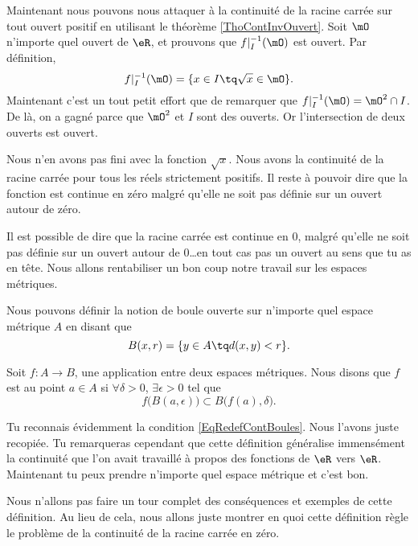 Maintenant nous pouvons nous attaquer à la continuité de la racine carrée sur tout ouvert positif en utilisant le théorème \ref{ThoContInvOuvert}. Soit $\mO$ n'importe quel ouvert de $\eR$, et prouvons que $f|_I^{-1}(\mO)$ est ouvert. Par définition,
\begin{equation}
  f|_I^{-1}(\mO)=\{ x\in I\tq \sqrt{x}\in\mO \}.
\end{equation}
Maintenant c'est un tout petit effort que de remarquer que $f|_I^{-1}(\mO)=\mO^2\cap I$. De là, on a gagné parce que $\mO^2$ et $I$ sont des ouverts. Or l'intersection de deux ouverts est ouvert. 

Nous n'en avons pas fini avec la fonction $\sqrt{x}$. Nous avons la continuité de la racine carrée pour tous les réels strictement positifs. Il reste à pouvoir dire que la fonction est continue en zéro malgré qu'elle ne soit pas définie sur un ouvert autour de zéro. 

Il est possible de dire que la racine carrée est continue en $0$, malgré qu'elle ne soit pas définie sur un ouvert autour de $0$\ldots en tout cas pas un ouvert au sens que tu as en tête. Nous allons rentabiliser un bon coup notre travail sur les espaces métriques.

Nous pouvons définir la notion de boule ouverte sur n'importe quel espace métrique $A$ en disant que
\[ 
  B(x,r)=\{ y\in A\tq d(x,y)<r \}.
\]
\begin{definition}      \label{DefContMetrique}
Soit $f\colon A\to B$, une application entre deux espaces métriques. Nous disons que $f$ est  au point $a\in A$ si $\forall \delta>0$, $\exists\epsilon>0$ tel que 
\begin{equation}
  f\big( B(a,\epsilon) \big)\subset B\big( f(a),\delta \big).
\end{equation}
\end{definition}
Tu reconnais évidemment la condition \eqref{EqRedefContBoules}. Nous l'avons juste recopiée. Tu remarqueras cependant que cette définition généralise immensément la continuité que l'on avait travaillé à propos des fonctions de $\eR$ vers $\eR$. Maintenant tu peux prendre n'importe quel espace métrique et c'est bon.

Nous n'allons pas faire un tour complet des conséquences et exemples de cette définition. Au lieu de cela, nous allons juste montrer en quoi cette définition règle le problème de la continuité de la racine carrée en zéro.

